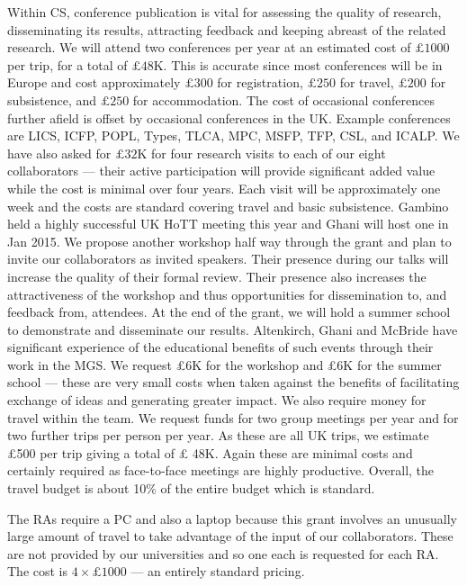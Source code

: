 \documentclass[a4paper,11pt]{article}
\begin{document}
 Within CS, conference publication is
vital for assessing the quality of research, disseminating its
results, attracting feedback and keeping abreast of the related
research.  We will attend two conferences per year at an estimated
cost of $\pounds 1000$ per trip, for a total of $\pounds
48$K. This is accurate since most conferences will
be in Europe and cost approximately $\pounds 300$ for registration,
$\pounds 250$ for travel, $\pounds 200$ for subsistence, and $\pounds
250$ for accommodation. The cost of occasional conferences further
afield is offset by occasional conferences in the UK. Example
conferences are LICS, ICFP, POPL, Types, TLCA, MPC, MSFP, TFP, CSL,
and ICALP.  We have also asked for $\pounds 32$K for four research visits
to each of our eight collaborators --- their active participation will
provide significant added value while the cost is minimal 
over four years. Each visit will be approximately one week and the costs
are standard covering travel and basic subsistence. Gambino held a
highly successful UK HoTT meeting this year and Ghani will host
one in Jan 2015. We propose another workshop half way through the
grant and plan to invite our collaborators as invited speakers.
Their presence during our talks will increase the quality of their
formal review. Their presence also increases the attractiveness of the
workshop and thus opportunities for dissemination to, and feedback
from, attendees. At the end of the grant, we will hold a summer school
to demonstrate and disseminate our results. Altenkirch, Ghani and
McBride have significant experience of the educational benefits of
such events through their work in the MGS. We request \pounds 6K for
the workshop and \pounds 6K for the summer school --- these are very
small costs when taken against the benefits of facilitating exchange
of ideas and generating greater impact. We also require money for
travel within the team. We request funds for two group meetings per year
and for two further trips per person per year. As these are all UK
trips, we estimate \pounds 500 per trip giving a total of \pounds
48K. Again these are minimal costs and certainly required as
face-to-face meetings are highly productive. Overall, the travel
budget is about 10\% of the entire budget which is standard.

\vspace{0.02in}

 The RAs require a PC and also a
laptop because this grant involves an unusually large amount of travel to take
advantage of the input of our collaborators. These are not provided by
our universities and so one each is requested for each RA. The cost is
$4\times\pounds1000$ --- an entirely standard
pricing. 
\end{document}
